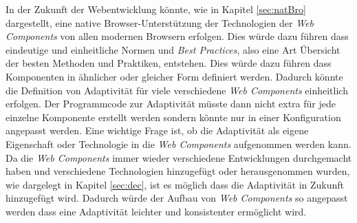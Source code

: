 \documentclass[12pt, paper=a4, bibtotoc, toc=listof, headsepline=true]{scrreprt}
\begin{document}
\newline
In der Zukunft der Webentwicklung könnte, wie in Kapitel \ref{sec:natBro} dargestellt, eine native Browser-Unterstützung der Technologien der \emph{Web Components} von allen modernen Browsern erfolgen. Dies würde dazu führen dass eindeutige und einheitliche Normen und \emph{Best Practices}, also eine Art Übersicht der besten Methoden und Praktiken, entstehen. Dies würde dazu führen dass Komponenten in ähnlicher oder gleicher Form definiert werden. Dadurch könnte die Definition von Adaptivität für viele verschiedene \emph{Web Components} einheitlich erfolgen. Der Programmcode zur Adaptivität müsste dann nicht extra für jede einzelne Komponente erstellt werden sondern könnte nur in einer Konfiguration angepasst werden. Eine wichtige Frage ist, ob die Adaptivität als eigene Eigenschaft oder Technologie in die \emph{Web Components} aufgenommen werden kann. Da die \emph{Web Components} immer wieder verschiedene Entwicklungen durchgemacht haben und verschiedene Technologien hinzugefügt oder herausgenommen wurden, wie dargelegt in Kapitel \ref{sec:dec}, ist es möglich dass die Adaptivität in Zukunft hinzugefügt wird. Dadurch würde der Aufbau von \emph{Web Components} so angepasst werden dass eine Adaptivität leichter und konsistenter ermöglicht wird.


	\printbibliography
\end{document}
